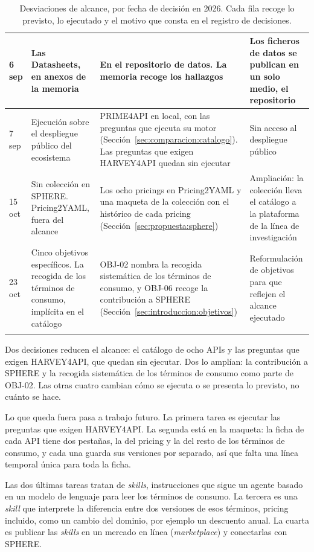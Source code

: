 \begin{longtable}{|>{\footnotesize}p{}|>{\footnotesize}p{}|>{\footnotesize}p{}|>{\footnotesize}p{}|}
\hline
\raggedright 6 sep & \raggedright Las Datasheets, en anexos de la memoria & \raggedright En el repositorio de datos. La memoria recoge los hallazgos & \raggedright Los ficheros de datos se publican en un solo medio, el repositorio \tabularnewline
\hline
\raggedright 7 sep & \raggedright Ejecución sobre el despliegue público del ecosistema & \raggedright PRIME4API en local, con las preguntas que ejecuta su motor (Sección~\ref{sec:comparacion:catalogo}). Las preguntas que exigen HARVEY4API quedan sin ejecutar & \raggedright Sin acceso al despliegue público \tabularnewline
\hline
\raggedright 15 oct & \raggedright Sin colección en SPHERE. Pricing2YAML, fuera del alcance & \raggedright Los ocho pricings en Pricing2YAML y una maqueta de la colección con el histórico de cada pricing (Sección~\ref{sec:propuesta:sphere}) & \raggedright Ampliación: la colección lleva el catálogo a la plataforma de la línea de investigación \tabularnewline
\hline
\raggedright 23 oct & \raggedright Cinco objetivos específicos. La recogida de los términos de consumo, implícita en el catálogo & \raggedright OBJ-02 nombra la recogida sistemática de los términos de consumo, y OBJ-06 recoge la contribución a SPHERE (Sección~\ref{sec:introduccion:objetivos}) & \raggedright Reformulación de objetivos para que reflejen el alcance ejecutado \tabularnewline
\hline
\noalign{\vskip\abovecaptionskip}
\caption[Desviaciones de alcance]{Desviaciones de alcance, por fecha de decisión en 2026. Cada fila recoge lo previsto, lo ejecutado y el motivo que consta en el registro de decisiones.}
\label{tab:metodologia:desviaciones}
\end{longtable}
\endgroup

Dos decisiones reducen el alcance: el catálogo de ocho APIs y las
preguntas que exigen HARVEY4API, que quedan sin ejecutar. Dos lo
amplían: la contribución a SPHERE y la recogida sistemática de los
términos de consumo como parte de OBJ-02. Las otras cuatro cambian cómo se
ejecuta o se presenta lo previsto, no cuánto se hace.

Lo que queda fuera pasa a trabajo futuro. La primera tarea es ejecutar
las preguntas que exigen HARVEY4API. La segunda está en la maqueta: la
ficha de cada API tiene dos pestañas, la del pricing y la del resto de
los términos de consumo, y cada una guarda sus versiones por separado,
así que falta una línea temporal única para toda la ficha.

Las dos últimas tareas tratan de \textit{skills}, instrucciones que sigue
un agente basado en un modelo de lenguaje para leer los términos de
consumo. La tercera es una \textit{skill} que interprete la diferencia
entre dos versiones de esos términos, pricing incluido, como un cambio del
dominio, por ejemplo un descuento anual. La cuarta es publicar las
\textit{skills} en un mercado en línea (\textit{marketplace}) y
conectarlas con SPHERE.

